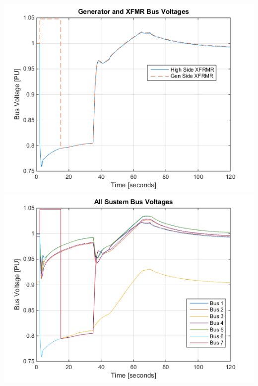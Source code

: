 \documentclass[12pt]{article}
\begin{document}
\begin{center}
\includegraphics[width=.49\linewidth]{genBusV} %
\includegraphics[width=.49\linewidth]{sysBusV} 
\end{center}

\pagebreak
\end{document}
